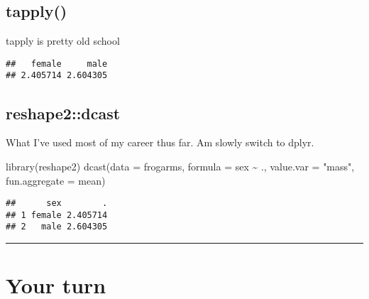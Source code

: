 \documentclass[
]{book}
\newenvironment{Shaded}{\begin{snugshade}}{\end{snugshade}}
\newcommand{\AttributeTok}[1]{\textcolor[rgb]{0.77,0.63,0.00}{#1}}
\newcommand{\FunctionTok}[1]{\textcolor[rgb]{0.00,0.00,0.00}{#1}}
\newcommand{\NormalTok}[1]{#1}
\newcommand{\SpecialCharTok}[1]{\textcolor[rgb]{0.00,0.00,0.00}{#1}}
\newcommand{\StringTok}[1]{\textcolor[rgb]{0.31,0.60,0.02}{#1}}
\begin{document}
\hypertarget{tapply}{%
\subsection{tapply()}\label{tapply}}

tapply is pretty old school

\begin{Shaded}
\end{Shaded}

\begin{verbatim}
##   female     male 
## 2.405714 2.604305
\end{verbatim}

\hypertarget{reshape2dcast}{%
\subsection{reshape2::dcast}\label{reshape2dcast}}

What I've used most of my career thus far. Am slowly switch to dplyr.

\begin{Shaded}
\begin{Highlighting}[]
\FunctionTok{library}\NormalTok{(reshape2)}
\FunctionTok{dcast}\NormalTok{(}\AttributeTok{data =}\NormalTok{ frogarms,}
      \AttributeTok{formula =}\NormalTok{ sex }\SpecialCharTok{\textasciitilde{}}\NormalTok{ .,}
      \AttributeTok{value.var =} \StringTok{"mass"}\NormalTok{,}
      \AttributeTok{fun.aggregate  =}\NormalTok{ mean)}
\end{Highlighting}
\end{Shaded}

\begin{verbatim}
##      sex        .
## 1 female 2.405714
## 2   male 2.604305
\end{verbatim}

\begin{center}\rule{0.5\linewidth}{0.5pt}\end{center}

\hypertarget{your-turn-3}{%
\section{Your turn}\label{your-turn-3}}
\end{document}
